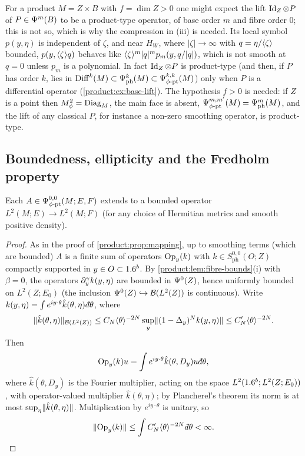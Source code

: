\begin{remark}\label{product:rem:base-lift}
For a product $M=Z\times B$ with $f=\dim Z>0$ one might expect the lift
$\operatorname{Id}_Z\otimes P$ of
$P\in\Psi^{m}(B)$ to be a product-type operator, of base order $m$ and fibre
order $0$; this is not so, which is why the compression in (iii) is needed. Its
local symbol $p(y,\eta)$ is independent of $\zeta$, and near $H_W$, where
$|\zeta|\to\infty$ with $q=\eta/\langle \zeta\rangle$ bounded, $p(y,\langle \zeta\rangle q)$ behaves like
$\langle \zeta\rangle^m|q|^mp_m(y,q/|q|)$, which is not smooth at $q=0$ unless $p_m$ is a
polynomial. In fact $\operatorname{Id}_Z\otimes P$ is product-type (and then, if $P$ has order
$k$, lies in $\operatorname{Diff}^{k}(M)\subset\Psi^{k}_{\mathrm{ph}}(M)\subset\Psi^{k,k}_{\phi\text{-}\mathrm{pt}}(M)$) only
when $P$ is a differential operator (\cref{product:ex:base-lift}). The hypothesis
$f>0$ is needed: if $Z$ is a point then $M^2_\phi=\operatorname{Diag}_M$, the main face is
absent, $\Psi^{m,m'}_{\phi\text{-}\mathrm{pt}}(M)=\Psi^{m}_{\mathrm{ph}}(M)$, and the lift of any classical
$P$, for instance a non-zero smoothing operator, is product-type.
\end{remark}

\subsection{Boundedness, ellipticity and the Fredholm property}

\begin{proposition}\label{product:prop:L2}
Each $A\in\Psi^{0,0}_{\phi\text{-}\mathrm{pt}}(M;E,F)$ extends to a bounded operator
$L^2(M;E)\longrightarrow L^2(M;F)$ (for any choice of Hermitian metrics and smooth
positive density).
\end{proposition}

\begin{proof}
As in the proof of \cref{product:prop:mapping}, up to smoothing terms (which are
bounded) $A$ is a finite sum of operators $\operatorname{Op}_y(k)$ with $k\in
S^{0,0}_{\mathrm{ph}}(O;Z)$ compactly supported in $y\in O\subset1.6^b$. By
\cref{product:lem:fibre-bounds}(i) with $\beta=0$, the operators
$\partial_y^\gamma k(y,\eta)$ are bounded in $\Psi^{0}(Z)$, hence uniformly bounded on
$L^2(Z;E_0)$ (the inclusion $\Psi^{0}(Z)\hookrightarrow\mathcal{B}(L^2(Z))$ is continuous).
Write $k(y,\eta)=\int e^{iy\cdot\theta}\hat k(\theta,\eta)\,\dbar\theta$, where
\begin{equation*}
\lVert \hat k(\theta,\eta)\rVert_{\mathcal{B}(L^2(Z))}\le C_N\langle \theta\rangle^{-2N}
\sup_y\lVert (1-\Delta_y)^Nk(y,\eta)\rVert\le C'_N\langle \theta\rangle^{-2N}.
\end{equation*}
Then
\begin{equation*}
\Op_y(k)u=\int e^{iy\cdot\theta}\hat k(\theta,D_y)u\,\dbar\theta,
\end{equation*}
where $\hat k(\theta,D_y)$ is the Fourier multiplier, acting on the space
$L^2(1.6^b;L^2(Z;E_0))$, with operator-valued multiplier $\hat k(\theta,\eta)$; by
Plancherel's theorem its norm is at most $\sup_\eta\lVert \hat k(\theta,\eta)\rVert$. Multiplication by
$e^{iy\cdot\theta}$ is unitary, so
\begin{equation*}
\norm{\Op_y(k)}\le\int C'_N\ang\theta^{-2N}\,\dbar\theta<\infty.
\end{equation*}
\end{proof}

